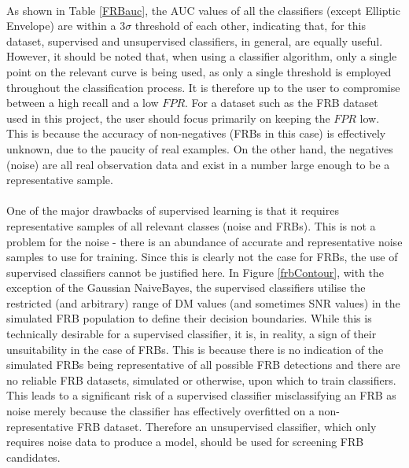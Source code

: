 \documentclass[12pt]{article}
\begin{document}
\paragraph{}
As shown in Table \ref{FRBauc}, the AUC values of all the classifiers (except Elliptic Envelope) are within a 3$\sigma$ threshold of each other, indicating that, for this dataset, supervised and unsupervised classifiers, in general, are equally useful. However, it should be noted that, when using a classifier algorithm, only a single point on the relevant curve is being used, as only a single threshold is employed throughout the classification process. It is therefore up to the user to compromise between a high recall and a low $FPR$. For a dataset such as the FRB dataset used in this project, the user should focus primarily on keeping the $FPR$ low. This is because the accuracy of non-negatives (FRBs in this case) is effectively unknown, due to the paucity of real examples. On the other hand, the negatives (noise) are all real observation data and exist in a number large enough to be a representative sample.
\paragraph{}
One of the major drawbacks of supervised learning is that it requires representative samples of all relevant classes (noise and FRBs). This is not a problem for the noise - there is an abundance of accurate and representative noise samples to use for training. Since this is clearly not the case for FRBs, the use of supervised classifiers cannot be justified here. In Figure \ref{frbContour}, with the exception of the Gaussian NaiveBayes, the supervised classifiers utilise the restricted (and arbitrary) range of DM values (and sometimes SNR values) in the simulated FRB population to define their decision boundaries. While this is technically desirable for a supervised classifier, it is, in reality, a sign of their unsuitability in the case of FRBs. This is because there is no indication of the simulated FRBs being representative of all possible FRB detections and there are no reliable FRB datasets, simulated or otherwise, upon which to train classifiers. This leads to a significant risk of a supervised classifier misclassifying an FRB as noise merely because the classifier has effectively overfitted on a non-representative FRB dataset. Therefore an unsupervised classifier, which only requires noise data to produce a model, should be used for screening FRB candidates.
\end{document}
